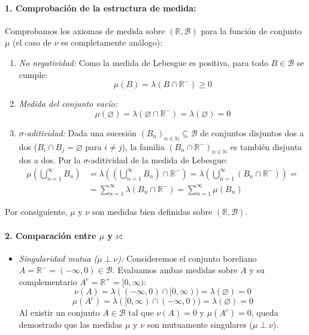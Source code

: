 \begin{problema}
\paragraph{1. Comprobación de la estructura de medida:}
Comprobamos los axiomas de medida sobre $(\mathbb{R}, \mathcal{B})$ para la función de conjunto $\mu$ (el caso de $\nu$ es completamente análogo):
\begin{enumerate}[label=\alph*)]
    \item \textit{No negatividad:} Como la medida de Lebesgue es positiva, para todo $B \in \mathcal{B}$ se cumple:
    \[
        \mu(B) = \lambda(B \cap \mathbb{R}^-) \ge 0
    \]
    \item \textit{Medida del conjunto vacío:} 
    \[
        \mu(\varnothing) = \lambda(\varnothing \cap \mathbb{R}^-) = \lambda(\varnothing) = 0
    \]
    \item \textit{$\sigma$-aditividad:} Dada una sucesión $(B_n)_{n \in \mathbb{N}} \subseteq \mathcal{B}$ de conjuntos disjuntos dos a dos ($B_i \cap B_j = \varnothing$ para $i \neq j$), la familia $(B_n \cap \mathbb{R}^-)_{n \in \mathbb{N}}$ es también disjunta dos a dos. Por la $\sigma$-aditividad de la medida de Lebesgue:
    \[
    \begin{array}{rl}
        \displaystyle \mu\left( \bigcup_{n=1}^\infty B_n \right) & \displaystyle = \lambda\left( \left(\bigcup_{n=1}^\infty B_n\right) \cap \mathbb{R}^- \right) = \lambda\left( \bigcup_{n=1}^\infty (B_n \cap \mathbb{R}^-) \right) = \\[16pt]
        & \displaystyle = \sum_{n=1}^\infty \lambda(B_n \cap \mathbb{R}^-) = \sum_{n=1}^\infty \mu(B_n)
    \end{array}
    \]
\end{enumerate}
Por consiguiente, $\mu$ y $\nu$ son medidas bien definidas sobre $(\mathbb{R}, \mathcal{B})$.

\paragraph{2. Comparación entre $\mu$ y $\nu$:}
\begin{itemize}
    \item \textit{Singularidad mutua ($\mu \perp \nu$):}
    Consideremos el conjunto boreliano $A = \mathbb{R}^- = (-\infty, 0) \in \mathcal{B}$. Evaluamos ambas medidas sobre $A$ y su complementario $A^c = \mathbb{R}^+ = [0, \infty)$:
    \[
        \nu(A) = \lambda((-\infty, 0) \cap [0, \infty)) = \lambda(\varnothing) = 0
    \]
    \[
        \mu(A^c) = \lambda([0, \infty) \cap (-\infty, 0)) = \lambda(\varnothing) = 0
    \]
    Al existir un conjunto $A \in \mathcal{B}$ tal que $\nu(A) = 0$ y $\mu(A^c) = 0$, queda demostrado que las medidas $\mu$ y $\nu$ son mutuamente singulares ($\mu \perp \nu$).


\end{itemize}
\end{problema}

